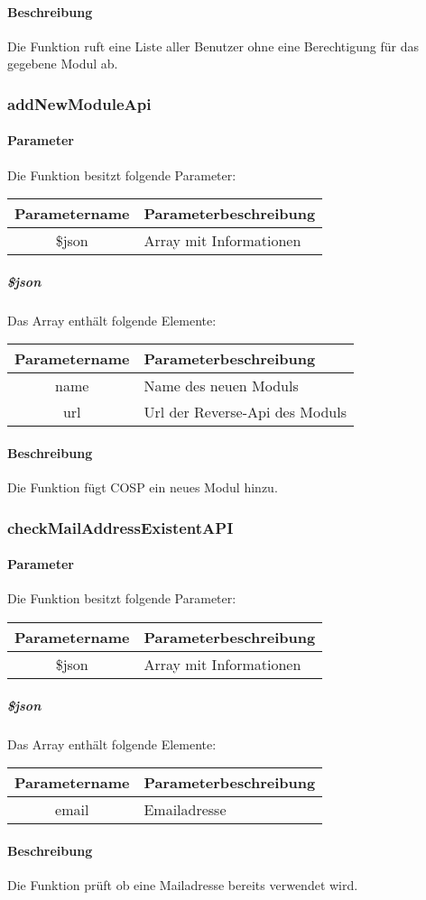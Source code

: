 \paragraph{Beschreibung} Die Funktion ruft eine Liste aller Benutzer ohne eine Berechtigung für das gegebene Modul ab.
\subsubsection{addNewModuleApi}
\paragraph{Parameter} Die Funktion besitzt folgende Parameter:
\begin{table}[H]
	\begin{tabular}{|c|p{11cm}|}
		\hline
		\textbf{Parametername} & \textbf{Parameterbeschreibung} \\ \hline
		\$json & Array mit Informationen \\ \hline
	\end{tabular}
\end{table}
\subparagraph{\$json}Das Array enthält folgende Elemente:
\begin{table}[H]
	\begin{tabular}{|c|p{11cm}|}
		\hline
		\textbf{Parametername} & \textbf{Parameterbeschreibung} \\ \hline
		name    & Name des neuen Moduls \\ \hline
		url     & Url der Reverse-Api des Moduls \\ \hline
	\end{tabular}
\end{table}
\paragraph{Beschreibung} Die Funktion fügt COSP ein neues Modul hinzu.
\subsubsection{checkMailAddressExistentAPI}
\paragraph{Parameter} Die Funktion besitzt folgende Parameter:
\begin{table}[H]
	\begin{tabular}{|c|p{11cm}|}
		\hline
		\textbf{Parametername} & \textbf{Parameterbeschreibung} \\ \hline
		\$json & Array mit Informationen \\ \hline
	\end{tabular}
\end{table}
\subparagraph{\$json}Das Array enthält folgende Elemente:
\begin{table}[H]
	\begin{tabular}{|c|p{11cm}|}
		\hline
		\textbf{Parametername} & \textbf{Parameterbeschreibung} \\ \hline
		email    & Emailadresse \\ \hline
	\end{tabular}
\end{table}
\paragraph{Beschreibung} Die Funktion prüft ob eine Mailadresse bereits verwendet wird.